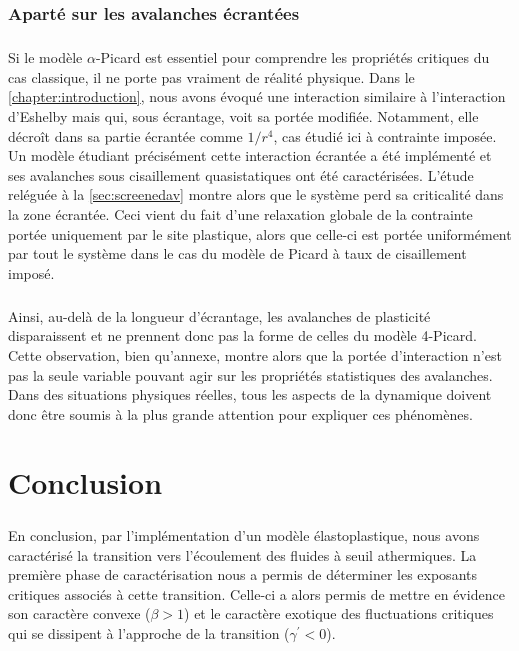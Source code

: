 \subsubsection{Aparté sur les avalanches écrantées}

\subparagraph{}Si le modèle $\alpha$-Picard est essentiel pour comprendre les propriétés critiques du cas classique, il ne porte pas vraiment de réalité physique. Dans le \autoref{chapter:introduction}, nous avons évoqué une interaction similaire à l'interaction d'Eshelby mais qui, sous écrantage, voit sa portée modifiée. Notamment, elle décroît dans sa partie écrantée comme $1/r^4$, cas étudié ici à contrainte imposée. Un modèle étudiant précisément cette interaction écrantée a été implémenté et ses avalanches sous cisaillement quasistatiques ont été caractérisées. L'étude reléguée à la \autoref{sec:screenedav} montre alors que le système perd sa criticalité dans la zone écrantée. Ceci vient du fait d'une relaxation globale de la contrainte portée uniquement par le site plastique, alors que celle-ci est portée uniformément par tout le système dans le cas du modèle de Picard à taux de cisaillement imposé.

\subparagraph{}Ainsi, au-delà de la longueur d'écrantage, les avalanches de plasticité disparaissent et ne prennent donc pas la forme de celles du modèle 4-Picard. Cette observation, bien qu'annexe, montre alors que la portée d'interaction n'est pas la seule variable pouvant agir sur les propriétés statistiques des avalanches. Dans des situations physiques réelles, tous les aspects de la dynamique doivent donc être soumis à la plus grande attention pour expliquer ces phénomènes.

\section{Conclusion}

\subparagraph{}En conclusion, par l'implémentation d'un modèle élastoplastique, nous avons caractérisé la transition vers l'écoulement des fluides à seuil athermiques. La première phase de caractérisation nous a permis de déterminer les exposants critiques associés à cette transition. Celle-ci a alors permis de mettre en évidence son caractère convexe ($\beta >1$) et le caractère exotique des fluctuations critiques qui se dissipent à l'approche de la transition ($\gamma^\prime<0$). 


